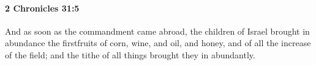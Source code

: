 
		\paragraph{2 Chronicles 31:5} %
			\label{2CHRONICLES-31-5}

			And as soon as the commandment came abroad, the children of Israel brought in abundance the firstfruits of corn, wine, and oil, and honey, and of all the increase of the field; and the tithe of all things brought they in abundantly.


